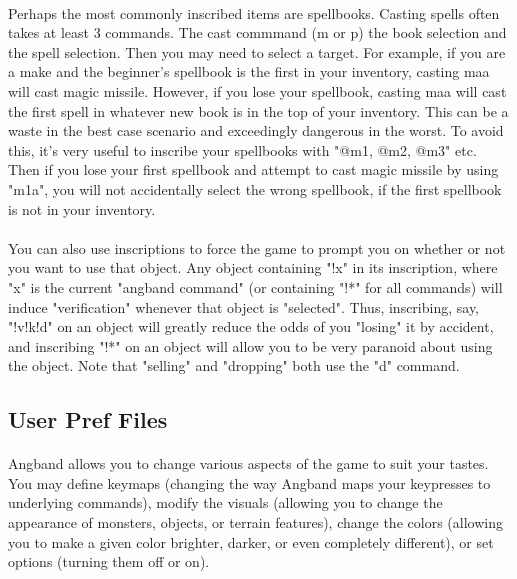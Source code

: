 \paragraph{}Perhaps the most commonly inscribed items are spellbooks. Casting
spells often takes at least 3 commands. The cast commmand (m or p) the
book selection and the spell selection. Then you may need to select a
target. For example, if you are a make and the beginner's spellbook is the
first in your inventory, casting maa will cast magic missile. However, if
you lose your spellbook, casting maa will cast the first spell in whatever
new book is in the top of your inventory. This can be a waste in the best
case scenario and exceedingly dangerous in the worst. To avoid this, it's
very useful to inscribe your spellbooks with "@m1, @m2, @m3" etc. Then if
you lose your first spellbook and attempt to cast magic missile by using
"m1a", you will not accidentally select the wrong spellbook, if the first
spellbook is not in your inventory.

\paragraph{}You can also use inscriptions to force the game to prompt you on
whether or not you want to use that object. Any object containing "!x" in
its inscription, where "x" is the current "angband command" (or containing
"!*" for all commands) will induce "verification" whenever that object is
"selected". Thus, inscribing, say, "!v!k!d" on an object will greatly reduce
the odds of you "losing" it by accident, and inscribing "!*" on an object will
allow you to be very paranoid about using the object. Note that "selling"
and "dropping" both use the "d" command.

\subsection{User Pref Files}
\paragraph{}Angband allows you to change various aspects of the game to suit
your tastes. You may define keymaps (changing the way Angband maps your
keypresses to underlying commands), modify the visuals (allowing you to
change the appearance of monsters, objects, or terrain features), change
the colors (allowing you to make a given color brighter, darker, or even
completely different), or set options (turning them off or on).

